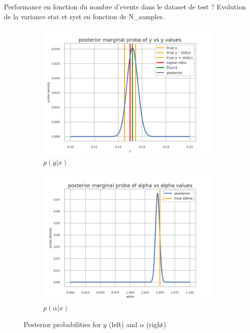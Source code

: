 Performance en fonction du nombre d'events dans le dataset de test ?
Evolution de la variance stat et syst en fonction de N\_samples.


\begin{figure}[htb]
  \centering
  \begin{subfigure}[t]{0.49\linewidth}
    \includegraphics[width=\linewidth]{minitoy/marginal_y.png}
    \caption{$p(y|x)$}
    \label{fig:marginal_y}
  \end{subfigure}%
  \hfill
  \begin{subfigure}[t]{0.49\linewidth}
    \includegraphics[width=\linewidth]{minitoy/marginal_alpha.png}
    \caption{$p(\alpha|x)$}
    \label{fig:marginal_alpha}
  \end{subfigure}
  \caption{Posterior probabilities for $y$ (left) and $\alpha$ (right)}
  \label{fig:marginals_gg}
\end{figure}

